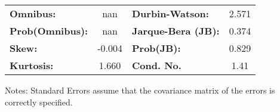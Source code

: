 \documentclass{article}
\begin{document}
\begin{center}
\begin{tabular}{lcccccc}
        \bottomrule
    \end{tabular}
    \begin{tabular}{lclc}
        \textbf{Omnibus:}       & nan    & \textbf{  Durbin-Watson:     } & 2.571 \\
        \textbf{Prob(Omnibus):} & nan    & \textbf{  Jarque-Bera (JB):  } & 0.374 \\
        \textbf{Skew:}          & -0.004 & \textbf{  Prob(JB):          } & 0.829 \\
        \textbf{Kurtosis:}      & 1.660  & \textbf{  Cond. No.          } & 1.41  \\
        \bottomrule
    \end{tabular}
\end{center}

Notes: \newline
[1] Standard Errors assume that the covariance matrix of the errors is correctly specified.
\end{document}
